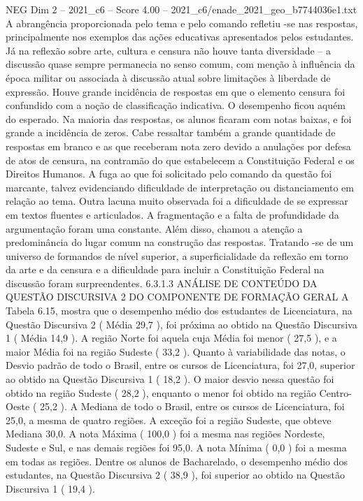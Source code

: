 \begin{textsample}{NEG Dim 2 – 2021\_c6 – Score 4.00 – 2021\_c6/enade\_2021\_geo\_b7744036e1.txt}
A abrangência proporcionada pelo tema e pelo comando refletiu -se nas respostas, principalmente nos exemplos das ações educativas apresentados pelos estudantes.
Já na reflexão sobre arte, cultura e censura não houve tanta diversidade – a discussão quase sempre permanecia no senso comum, com menção à influência da época militar ou associada à discussão atual sobre limitações à liberdade de expressão.
Houve grande incidência de respostas em que o elemento censura foi confundido com a noção de classificação indicativa.
O desempenho ficou aquém do esperado.
Na maioria das respostas, os alunos ficaram com notas baixas, e foi grande a incidência de zeros.
Cabe ressaltar também a grande quantidade de respostas em branco e as que receberam nota zero devido a anulações por defesa de atos de censura, na contramão do que estabelecem a Constituição Federal e os Direitos Humanos.
A fuga ao que foi solicitado pelo comando da questão foi marcante, talvez evidenciando dificuldade de interpretação ou distanciamento em relação ao tema.
Outra lacuna muito observada foi a dificuldade de se expressar em textos fluentes e articulados.
A fragmentação e a falta de profundidade da argumentação foram uma constante.
Além disso, chamou a atenção a predominância do lugar comum na construção das respostas.
Tratando -se de um universo de formandos de nível superior, a superficialidade da reflexão em torno da arte e da censura e a dificuldade para incluir a Constituição Federal na discussão foram surpreendentes. 6.3.1.3 ANÁLISE DE CONTEÚDO DA QUESTÃO DISCURSIVA 2 DO COMPONENTE DE FORMAÇÃO GERAL A Tabela 6.15, mostra que o desempenho médio dos estudantes de Licenciatura, na Questão Discursiva 2 ( Média 29,7 ), foi próxima ao obtido na Questão Discursiva 1 ( Média 14,9 ).
A região Norte foi aquela cuja Média foi menor ( 27,5 ), e a maior Média foi na região Sudeste ( 33,2 ).
Quanto à variabilidade das notas, o Desvio padrão de todo o Brasil, entre os cursos de Licenciatura, foi 27,0, superior ao obtido na Questão Discursiva 1 ( 18,2 ).
O maior desvio nessa questão foi obtido na região Sudeste ( 28,2 ), enquanto o menor foi obtido na região Centro-Oeste ( 25,2 ).
A Mediana de todo o Brasil, entre os cursos de Licenciatura, foi 25,0, a mesma de quatro regiões.
A exceção foi a região Sudeste, que obteve Mediana 30,0.
A nota Máxima ( 100,0 ) foi a mesma nas regiões Nordeste, Sudeste e Sul, e nas demais regiões foi 95,0.
A nota Mínima ( 0,0 ) foi a mesma em todas as regiões.
Dentre os alunos de Bacharelado, o desempenho médio dos estudantes, na Questão Discursiva 2 ( 38,9 ), foi superior ao obtido na Questão Discursiva 1 ( 19,4 ).

\end{textsample}
